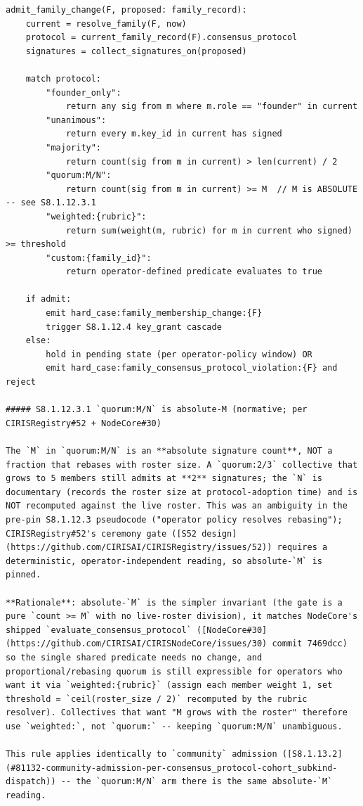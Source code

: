 \documentclass[10pt]{article}
\begin{document}
\begin{lstlisting}
admit_family_change(F, proposed: family_record):
    current = resolve_family(F, now)
    protocol = current_family_record(F).consensus_protocol
    signatures = collect_signatures_on(proposed)

    match protocol:
        "founder_only":
            return any sig from m where m.role == "founder" in current
        "unanimous":
            return every m.key_id in current has signed
        "majority":
            return count(sig from m in current) > len(current) / 2
        "quorum:M/N":
            return count(sig from m in current) >= M  // M is ABSOLUTE -- see S8.1.12.3.1
        "weighted:{rubric}":
            return sum(weight(m, rubric) for m in current who signed) >= threshold
        "custom:{family_id}":
            return operator-defined predicate evaluates to true

    if admit:
        emit hard_case:family_membership_change:{F}
        trigger S8.1.12.4 key_grant cascade
    else:
        hold in pending state (per operator-policy window) OR
        emit hard_case:family_consensus_protocol_violation:{F} and reject

##### S8.1.12.3.1 `quorum:M/N` is absolute-M (normative; per CIRISRegistry#52 + NodeCore#30)

The `M` in `quorum:M/N` is an **absolute signature count**, NOT a fraction that rebases with roster size. A `quorum:2/3` collective that grows to 5 members still admits at **2** signatures; the `N` is documentary (records the roster size at protocol-adoption time) and is NOT recomputed against the live roster. This was an ambiguity in the pre-pin S8.1.12.3 pseudocode ("operator policy resolves rebasing"); CIRISRegistry#52's ceremony gate ([S52 design](https://github.com/CIRISAI/CIRISRegistry/issues/52)) requires a deterministic, operator-independent reading, so absolute-`M` is pinned.

**Rationale**: absolute-`M` is the simpler invariant (the gate is a pure `count >= M` with no live-roster division), it matches NodeCore's shipped `evaluate_consensus_protocol` ([NodeCore#30](https://github.com/CIRISAI/CIRISNodeCore/issues/30) commit 7469dcc) so the single shared predicate needs no change, and proportional/rebasing quorum is still expressible for operators who want it via `weighted:{rubric}` (assign each member weight 1, set threshold = `ceil(roster_size / 2)` recomputed by the rubric resolver). Collectives that want "M grows with the roster" therefore use `weighted:`, not `quorum:` -- keeping `quorum:M/N` unambiguous.

This rule applies identically to `community` admission ([S8.1.13.2](#81132-community-admission-per-consensus_protocol-cohort_subkind-dispatch)) -- the `quorum:M/N` arm there is the same absolute-`M` reading.
\end{lstlisting}
\end{document}
